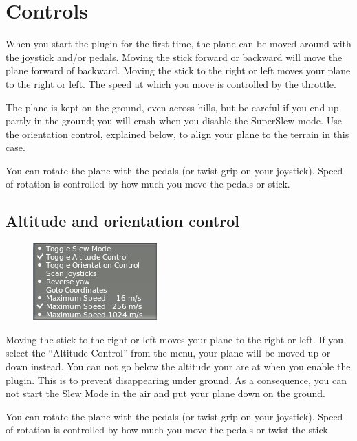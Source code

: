 \documentclass[a4paper,12pt]{article}
\begin{document}
\section*{Controls}

When you start the plugin for the first time, the plane can be moved
around with the joystick and/or pedals. Moving the stick forward or
backward will move the plane forward of backward. Moving the stick to
the right or left moves your plane to the right or left.  The speed at
which you move is controlled by the throttle.

The plane is kept on the ground, even across hills, but be careful if you end up
partly in the ground; you will crash when you disable the SuperSlew mode. Use
the orientation control, explained below, to align your plane to the terrain in
this case.

\vspace{0.5\baselineskip}
You can rotate the plane with the pedals (or twist grip on your
joystick). Speed of rotation is controlled by how much you move the
pedals or stick.

\subsection*{Altitude and orientation control}

\begin{figure}[h!]%
\centering
\includegraphics[scale=1]{slewaltitude.png}
\label{fig:infowindow}
\end{figure}

Moving the stick to the right or left moves your plane to the right or
left. If you select the ``Altitude Control'' from the menu, your plane
will be moved up or down instead. You can not go below the altitude
your are at when you enable the plugin. This is to prevent
disappearing under ground. As a consequence, you can not start the
Slew Mode in the air and put your plane down on the ground.

\vspace{0.5\baselineskip}
You can rotate the plane with the pedals (or twist grip on your
joystick). Speed of rotation is controlled by how much you move the
pedals or twist the stick.
\end{document}

